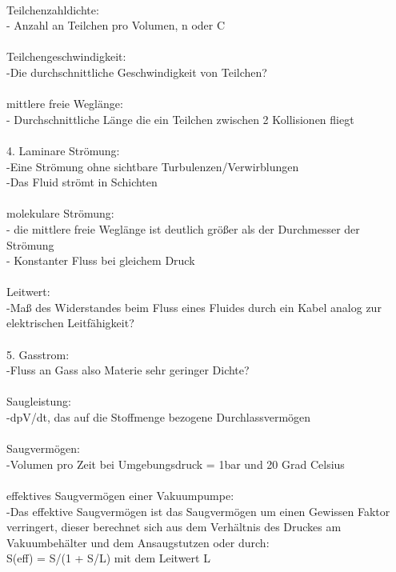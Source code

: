 \\
	   Teilchenzahldichte:\\
	   	- Anzahl an Teilchen pro Volumen, n oder C\\
\\
	   Teilchengeschwindigkeit:\\
		-Die durchschnittliche Geschwindigkeit von Teilchen?\\
\\
	   mittlere freie Weglänge:\\
	   	- Durchschnittliche Länge die ein Teilchen zwischen 2 Kollisionen fliegt\\
\\
	4. Laminare Strömung:\\
		-Eine Strömung ohne sichtbare Turbulenzen/Verwirblungen\\
		-Das Fluid strömt in Schichten\\
\\
	   molekulare Strömung:\\
		- die mittlere freie Weglänge ist deutlich größer als der Durchmesser der Strömung\\
		- Konstanter Fluss bei gleichem Druck\\
\\
	   Leitwert:\\
		-Maß des Widerstandes beim Fluss eines Fluides durch ein Kabel analog zur elektrischen Leitfähigkeit?\\ 
\\
	5. Gasstrom: \\
		-Fluss an Gass also Materie sehr geringer Dichte?\\
\\
	   Saugleistung:\\
		-dpV/dt, das auf die Stoffmenge bezogene Durchlassvermögen\\
\\
	   Saugvermögen:\\
	   	-Volumen pro Zeit bei Umgebungsdruck = 1bar und 20 Grad Celsius\\
\\
	   effektives Saugvermögen einer Vakuumpumpe:\\
	   	-Das effektive Saugvermögen ist das Saugvermögen um einen Gewissen Faktor verringert, dieser berechnet sich aus dem Verhältnis des Druckes am Vakuumbehälter und dem Ansaugstutzen oder durch:\\
			S(eff) = S/(1 + S/L) mit dem Leitwert L\\
\\
